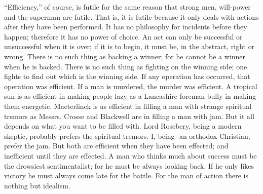 \documentclass{book}
\begin{document}
“Efficiency,” of course, is futile for the same reason that strong men, will-power and the superman are futile. That is, it is futile because it only deals with actions after they have been performed. It has no philosophy for incidents before they happen; therefore it has no power of choice. An act can only be successful or unsuccessful when it is over; if it is to begin, it must be, in the abstract, right or wrong. There is no such thing as backing a winner; for he cannot be a winner when he is backed. There is no such thing as fighting on the winning side; one fights to find out which is the winning side. If any operation has occurred, that operation was efficient. If a man is murdered, the murder was efficient. A tropical sun is as efficient in making people lazy as a Lancashire foreman bully in making them energetic. Maeterlinck is as efficient in filling a man with strange spiritual tremors as Messrs. Crosse and Blackwell are in filling a man with jam. But it all depends on what you want to be filled with. Lord Rosebery, being a modern skeptic, probably prefers the spiritual tremors. I, being -an orthodox Christian, prefer the jam. But both are efficient when they have been effected; and inefficient until they are effected. A man who thinks much about success must be the drowsiest sentimentalist; for he must be always looking back. If he only likes victory he must always come late for the battle. For the man of action there is nothing but idealism.
\end{document}
